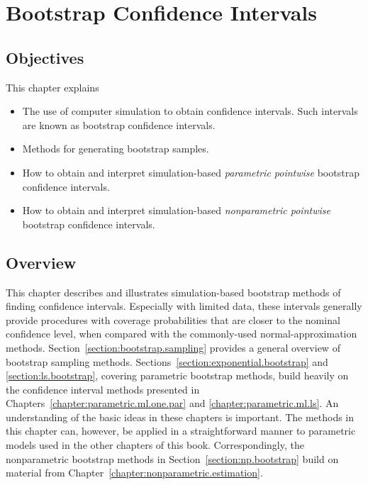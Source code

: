 
\setcounter{chapter}{8}


\chapter{Bootstrap  Confidence Intervals}
\label{chapter:bootstrap}




\section*{Objectives}
This chapter explains
\begin{itemize} 
\item 
The use of computer simulation
to obtain confidence intervals. Such intervals
are known as bootstrap confidence intervals.
\item
Methods for generating bootstrap samples.
\item 
How to obtain and interpret simulation-based 
{\em parametric pointwise} bootstrap confidence intervals.
\item 
How to obtain and interpret simulation-based {\em nonparametric 
pointwise} bootstrap confidence intervals.
\end{itemize}


\section*{Overview}
This chapter describes and illustrates simulation-based bootstrap
methods of finding confidence intervals. Especially with limited
data, these intervals generally provide procedures with coverage
probabilities that are closer to the nominal confidence level, when
compared with the commonly-used normal-approximation methods.
Section~\ref{section:bootstrap.sampling} provides a general overview
of bootstrap sampling methods.
Sections~\ref{section:exponential.bootstrap} and
\ref{section:ls.bootstrap},
covering parametric bootstrap methods, build heavily on the confidence
interval methods presented in
Chapters~\ref{chapter:parametric.ml.one.par} and
\ref{chapter:parametric.ml.ls}. An understanding of the basic ideas
in these chapters is important. The methods in this chapter can,
however, be applied in a straightforward manner to parametric
models used in the other chapters of this book. Correspondingly, the
nonparametric bootstrap methods in
Section~\ref{section:np.bootstrap} build on material from
Chapter~\ref{chapter:nonparametric.estimation}.


